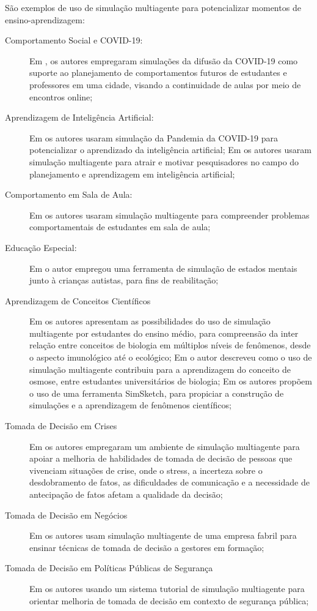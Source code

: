 São exemplos de uso de simulação multiagente para potencializar momentos de ensino-aprendizagem:
\begin{description}
\item [Comportamento Social e COVID-19:] Em \cite{santoro_building_2020}, os autores empregaram simulações da difusão da COVID-19 como suporte ao planejamento de comportamentos futuros de estudantes e professores em uma cidade, visando a continuidade de aulas por meio de encontros online; 
\item [Aprendizagem de Inteligência Artificial:] Em \cite{juarez_analysis_2022} os autores usaram simulação da Pandemia da COVID-19 para potencializar o aprendizado da inteligência artificial; Em \cite{filho_proposal_2007} os autores usaram simulação multiagente para atrair e motivar pesquisadores no campo do planejamento e aprendizagem em inteligência artificial;
\item [Comportamento em Sala de Aula:] Em \cite{zhao_research_2011} os autores usaram simulação multiagente para compreender problemas comportamentais de estudantes em sala de aula;
\item [Educação Especial:] Em \cite{galitsky_computational_2013} o autor empregou uma ferramenta de simulação de estados mentais junto à crianças autistas, para fins de reabilitação;
\item [Aprendizagem de Conceitos Científicos]
Em \cite{wilensky_thinking_2006} os autores apresentam as possibilidades do uso de simulação multiagente por estudantes do ensino médio, para compreensão da inter relação entre conceitos de biologia em múltiplos níveis de fenômenos, desde o aspecto imunológico até o ecológico; Em \cite{kottonau_interactive_2011} o autor descreveu como o uso de simulação multiagente contribuiu para a aprendizagem do conceito de osmose, entre estudantes universitários de biologia; Em \cite{bollen_simsketch_2013} os autores propõem o uso de uma ferramenta SimSketch, para propiciar a construção de simulações e a aprendizagem de fenômenos científicos;
\item [Tomada de Decisão em Crises] Em \cite{tena-chollet_design_2016} os autores empregaram um ambiente de simulação multiagente para apoiar a melhoria de habilidades de tomada de decisão de pessoas que vivenciam  situações de crise, onde o stress, a incerteza sobre o desdobramento de fatos, as dificuldades de comunicação e a necessidade de antecipação de fatos afetam a qualidade da decisão; 
\item [Tomada de Decisão em Negócios] Em \cite{hishiyama_business_2015} os autores usam simulação multiagente de uma empresa fabril para ensinar técnicas de tomada de decisão a gestores em formação; 
\item [Tomada de Decisão em Políticas Públicas de Segurança] Em \cite{furtado_multiagent_2006} os autores usando um sistema tutorial de simulação multiagente para orientar melhoria de tomada de decisão em contexto de segurança pública;
\end{description}


